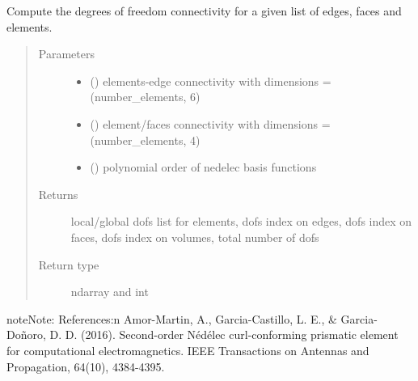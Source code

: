 \documentclass[letterpaper,10pt,english]{sphinxmanual}
\begin{document}
\begin{fulllineitems}
\label{\detokenize{petgem/hvfem:petgem.hvfem.computeConnectivityDOFS}}
Compute the degrees of freedom connectivity for a given list of edges, faces and elements.
\begin{quote}\begin{description}
\item[{Parameters}] \leavevmode\begin{itemize}
\item {} 
 () \textendash{} elements-edge connectivity with dimensions = (number\_elements, 6)

\item {} 
 () \textendash{} element/faces connectivity with dimensions = (number\_elements, 4)

\item {} 
 () \textendash{} polynomial order of nedelec basis functions

\end{itemize}

\item[{Returns}] \leavevmode
local/global dofs list for elements, dofs index on edges, dofs index on faces, dofs index on volumes, total number of dofs

\item[{Return type}] \leavevmode
ndarray and int

\end{description}\end{quote}

\begin{sphinxadmonition}{note}{Note:}
References:n
Amor-Martin, A., Garcia-Castillo, L. E., \& Garcia-Doñoro, D. D.
(2016). Second-order Nédélec curl-conforming prismatic element
for computational electromagnetics. IEEE Transactions on
Antennas and Propagation, 64(10), 4384-4395.
\end{sphinxadmonition}

\end{fulllineitems}

\end{document}
